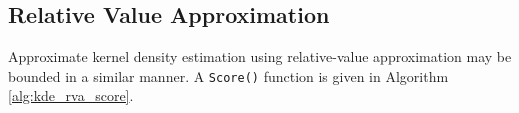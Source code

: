 
\subsection{Relative Value Approximation}

Approximate kernel density estimation using relative-value approximation may be
bounded in a similar manner.  A \texttt{Score()} function is given in Algorithm
\ref{alg:kde_rva_score}.
